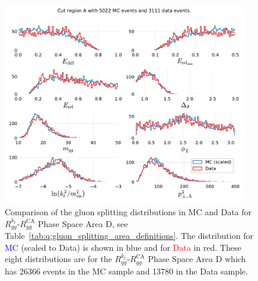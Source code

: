 \begin{figure}[h!]
  \centerfloat
  \includegraphics[width=0.95\textwidth, trim=0 0 0 0, clip, page=4]{figures/quarks/gtag-R_kt_CA_histograms-down_sample=1.00-ML_vars=vertex-selection=b-ejet_min=4-n_iter_RS_lgb=99-n_iter_RS_xgb=9-cdot_cut=0.90-version=19-njet=4.pdf}
  \caption[Gluon Splitting Distribution Comparison in MC and Data for $R_{gg}^{k_t}$-$R_{gg}^\mathrm{CA}$ Phase Space Area D]
          {Comparison of the gluon splitting distributions in MC and Data for $R_{gg}^{k_t}$-$R_{gg}^\mathrm{CA}$ Phase Space Area D, see Table~\ref{tab:q:gluon_splitting_area_definitions}. The distribution for \textcolor{blue}{MC} (scaled to Data) is shown in blue and for \textcolor{red}{Data} in red. These eight distributions are for the $R_{gg}^{k_t}$-$R_{gg}^\mathrm{CA}$ Phase Space Area D which has \num{26366} events in the MC sample and \num{13780} in the Data sample. } 
  \label{fig:q:R_kt_CA_cut_D}
\end{figure}